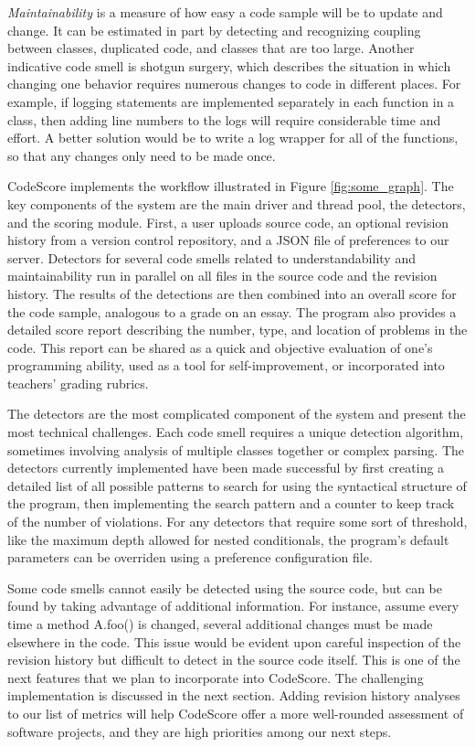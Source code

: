 \documentclass{sig-alternate}
\begin{document}
\emph{Maintainability} is a measure of how easy a code sample will be to update
and change. It can be estimated in part by detecting and recognizing coupling
between classes, duplicated code, and classes that are too large. Another
indicative code smell is shotgun surgery, which describes the situation in which
changing one behavior requires numerous changes to code in different places. For
example, if logging statements are implemented separately in each function in a
class, then adding line numbers to the logs will require considerable time and effort. A
better solution would be to write a log wrapper for all of the functions, so
that any changes only need to be made once. 

CodeScore implements the workflow illustrated in Figure \ref{fig:some_graph}. The
key components of the system are the main driver and thread pool, the detectors,
and the scoring module. First, a user uploads source code, an optional
revision history from a version control repository, and a JSON file of
preferences to our server. Detectors for several code smells related to
understandability and maintainability run in parallel on all files in the source
code and the revision history. The results of the detections are then combined 
into an overall score for the code sample, analogous to a grade on an essay. The program 
also provides a detailed score report describing the number, type, and location of
problems in the code. This report can be shared as a quick and objective
evaluation of one's programming ability, used as a tool for
self-improvement, or incorporated into teachers' grading rubrics. 

The detectors are the most complicated component of the system and present the
most technical challenges. Each code smell requires a unique detection
algorithm, sometimes involving analysis of multiple classes together or complex
parsing. The detectors currently implemented have been made successful by first
creating a detailed list of all possible patterns to search for using the
syntactical structure of the program, then implementing the search pattern and
a counter to keep track of the number of violations. For any detectors that
require some sort of threshold, like the maximum depth allowed for nested
conditionals, the program's default parameters can be overriden using a
preference configuration file.

Some code smells cannot easily be detected using the source code, but
can be found by taking advantage of additional information. For instance, assume
every time a method A.foo() is changed, several additional changes must be made
elsewhere in the code. This issue would be evident upon careful inspection of the
revision history but difficult to detect in the source code itself. This is one
of the next features that we plan to incorporate into CodeScore. The challenging
implementation is discussed in the next section. Adding revision history analyses
to our list of metrics will help CodeScore offer a more well-rounded assessment of software
projects, and they are high priorities among our next steps.
\end{document}
